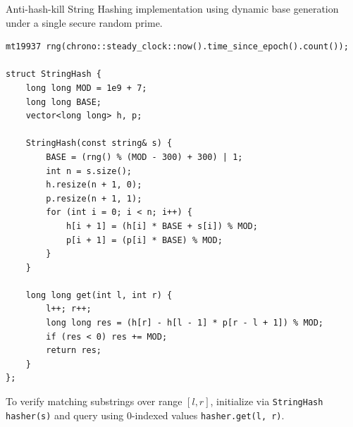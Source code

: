 
Anti-hash-kill String Hashing implementation using dynamic base generation under a single secure random prime.

\begin{lstlisting}
mt19937 rng(chrono::steady_clock::now().time_since_epoch().count());

struct StringHash {
    long long MOD = 1e9 + 7;
    long long BASE;
    vector<long long> h, p;

    StringHash(const string& s) {
        BASE = (rng() % (MOD - 300) + 300) | 1;
        int n = s.size();
        h.resize(n + 1, 0);
        p.resize(n + 1, 1);
        for (int i = 0; i < n; i++) {
            h[i + 1] = (h[i] * BASE + s[i]) % MOD;
            p[i + 1] = (p[i] * BASE) % MOD;
        }
    }

    long long get(int l, int r) {
        l++; r++;
        long long res = (h[r] - h[l - 1] * p[r - l + 1]) % MOD;
        if (res < 0) res += MOD;
        return res;
    }
};
\end{lstlisting}

To verify matching substrings over range $[l, r]$, initialize via \lstinline|StringHash hasher(s)| and query using 0-indexed values \lstinline|hasher.get(l, r)|.
